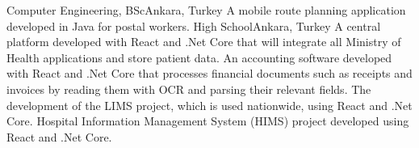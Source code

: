 \documentclass[
    10pt,
    A4,
    english,
    draft = false,
    twoside = false,
]{article}
\begin{document}

	{Computer Engineering, BSc}{Ankara, Turkey}
    {
      {A mobile route planning application developed in Java for postal workers.}
    }
	{High School}{Ankara, Turkey}{}
    {
      {A central platform developed with React and .Net Core that will integrate all Ministry of Health applications and store patient data.}
      {An accounting software developed with React and .Net Core that processes financial documents such as receipts and invoices by reading them with OCR and parsing their relevant fields.}
    }
    {
      {The development of the LIMS project, which is used nationwide, using React and .Net Core.}
      {Hospital Information Management System (HIMS) project developed using React and .Net Core.}
    }
\end{document}
